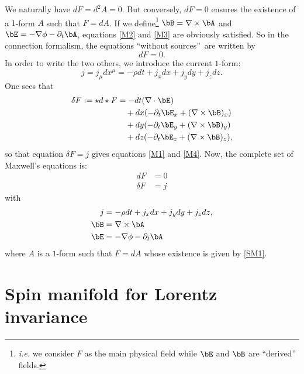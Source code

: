 We naturally have $dF=d^2A=0$. But conversely, $dF=0$ ensures the existence of a $1$-form $A$ such that $F=dA$. If we define\footnote{\emph{i.e.} we consider $F$ as the main physical field while $\bE$ and $\bB$ are ``derived'' fields.} $\bB=\nabla\times\bA$ and $\bE=-\nabla\phi-\partial_t\bA$, equations \eqref{M2} and \eqref{M3} are obviously satisfied. So in the connection formalism, the equations ``without sources''\ are written by
\begin{equation}\label{M23}
 dF=0.
\end{equation}
In order to write the two others, we introduce the current $1$-form:
\[
  j=j_{\mu}dx^{\mu}=-\rho dt+j_x dx+j_y dy+j_z dz.
\]
%
One sees that
\begin{equation}
\begin{split}
  \delta F:=\star d\star F&=-dt(\nabla\cdot\bE)\\
                &\quad+ dx(-\partial_t \bE_x+ (\nabla\times\bB)_x )\\
		&\quad+ dy(-\partial_t \bE_y+ (\nabla\times\bB)_y )\\
		&\quad+ dz(-\partial_t \bE_z+ (\nabla\times\bB)_z ),
\end{split}
\end{equation}
so that equation $\delta F=j$ gives equations \eqref{M1} and \eqref{M4}. Now, the complete set of Maxwell's equations is:
\begin{subequations}
\begin{align}
   d F&= 0\label{SM1}\\
   \delta F &=j\label{SM2}
\end{align}
\end{subequations}
with
\begin{subequations}
\begin{align}
j&=-\rho dt+j_x dx+j_y dy+j_z dz,\\
  \bB&=\nabla\times\bA\\
  \bE&=-\nabla\phi-\partial_t\bA
\end{align}
\end{subequations}
where $A$ is a $1$-form such that $F=dA$ whose existence is given by \eqref{SM1}.

\section{Spin manifold for Lorentz invariance}
\label{subsec:incl_Lorentz}


